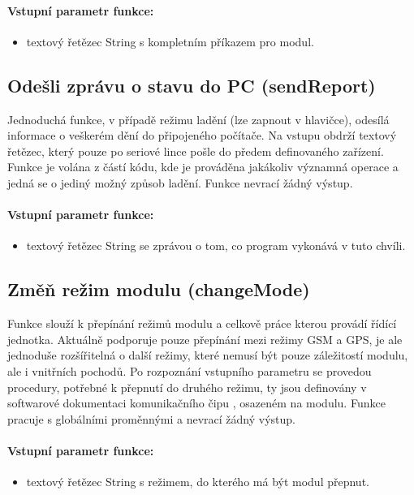\documentclass[FM,MP]{tulthesis}  %
\begin{document}
\paragraph{Vstupní parametr funkce:}
\begin{itemize}
\item textový řetězec String s kompletním příkazem pro modul.
\end{itemize}

\subsection{Odešli zprávu o stavu do PC (sendReport)}
Jednoduchá funkce, v případě režimu ladění (lze zapnout v hlavičce), odesílá informace o veškerém dění do připojeného počítače. Na vstupu obdrží textový řetězec, který pouze po seriové lince pošle do předem definovaného zařízení. Funkce je volána z částí kódu, kde je prováděna jakákoliv významná operace a jedná se o jediný možný způsob ladění. Funkce nevrací žádný výstup.

\paragraph{Vstupní parametr funkce:}
\begin{itemize}
\item textový řetězec String se zprávou o tom, co program vykonává v tuto chvíli.
\end{itemize}

\subsection{Změň režim modulu (changeMode)}
Funkce slouží k přepínání režimů modulu a celkově práce kterou provádí řídící jednotka. Aktuálně podporuje pouze přepínání mezi režimy GSM a GPS, je ale jednoduše rozšířitelná o další režimy, které nemusí být pouze záležitostí modulu, ale i vnitřních pochodů. Po rozpoznání vstupního parametru se provedou procedury, potřebné k přepnutí do druhého režimu, ty jsou definovány v softwarové dokumentaci komunikačního čipu \cite{SIMCOM SW}, osazeném na modulu. Funkce pracuje s globálními proměnnými a nevrací žádný výstup.

\paragraph{Vstupní parametr funkce:}
\begin{itemize}
\item textový řetězec String s režimem, do kterého má být modul přepnut.
\end{itemize}
\end{document}
